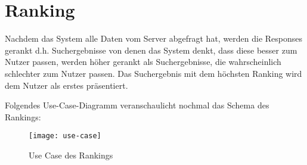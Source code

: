 \author{Lothar Mödl, Gottfried von Recum}

\section{Ranking}

Nachdem das System alle Daten vom Server abgefragt hat, werden die Responses gerankt d.h. 
Suchergebnisse von denen das System denkt, dass diese besser zum Nutzer passen, werden höher 
gerankt als Suchergebnisse, die wahrscheinlich schlechter zum Nutzer passen. Das Suchergebnis mit 
dem höchsten Ranking wird dem Nutzer als erstes präsentiert.

Folgendes Use-Case-Diagramm veranschaulicht nochmal das Schema des Rankings:   

\begin{figure}[h]
	\centering
	\texttt{[image: use-case]}
	\caption{Use Case des Rankings}
	\label{fig:Ranking Use-Case}
\end{figure}
\pagebreak